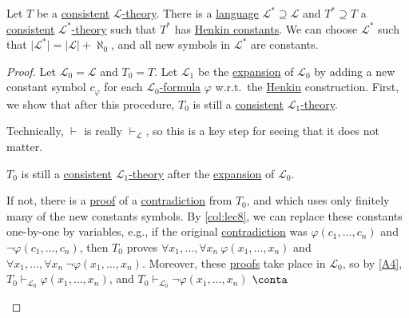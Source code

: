 \begin{theorem}\label{thm:lec8}
	Let \(T\) be a \hyperref[def:consistent]{consistent} \hyperref[def:theory]{\(\mathcal{L} \)-theory}. There is a \hyperref[def:language]{language} \(\mathcal{L} ^{\ast} \supseteq \mathcal{L}\) and \(T^{\ast} \supseteq T\) a \hyperref[def:consistent]{consistent} \hyperref[def:theory]{\(\mathcal{L} ^{\ast} \)-theory} such that \(T^{\ast} \) has \hyperref[def:Henkin-constant]{Henkin constants}. We can choose \(\mathcal{L} ^{\ast} \) such that \(\vert \mathcal{L} ^{\ast} \vert = \vert \mathcal{L} \vert + \aleph _0\), and all new symbols in \(\mathcal{L} ^{\ast} \) are constants.
\end{theorem}
\begin{proof}
	Let \(\mathcal{L} _0 = \mathcal{L} \) and \(T_0 = T\). Let \(\mathcal{L} _1\) be the \hyperref[not:expansion]{expansion} of \(\mathcal{L} _0\) by adding a new constant symbol \(c_{\varphi} \) for each \hyperref[def:formula]{\(\mathcal{L} _0\)-formula} \(\varphi\) w.r.t.\ the \hyperref[def:Henkin-constant]{Henkin} construction. First, we show that after this procedure, \(T_0\) is still a \hyperref[def:consistent]{consistent} \hyperref[def:theory]{\(\mathcal{L} _1\)-theory}.

	\begin{remark}
		Technically, \(\vdash \) is really \(\vdash _{\mathcal{L} }\), so this is a key step for seeing that it does not matter.
	\end{remark}

	\begin{claim}
		\(T_0\) is still a \hyperref[def:consistent]{consistent} \hyperref[def:theory]{\(\mathcal{L} _1\)-theory} after the \hyperref[not:expansion]{expansion} of \(\mathcal{L} _0\).
	\end{claim}
	\begin{explanation}
		If not, there is a \hyperref[def:proof]{proof} of a \hyperref[prop:proof-by-contradiction]{contradiction} from \(T_0\), and which uses only finitely many of the new constants symbols. By \autoref{col:lec8}, we can replace these constants one-by-one by variables, e.g., if the original \hyperref[prop:proof-by-contradiction]{contradiction} was \(\varphi (c_1, \ldots , c_n)\) and \(\lnot \varphi (c_1, \ldots , c_n)\), then \(T_0\) proves \(\forall x_1, \ldots , \forall x_n\ \varphi (x_1, \ldots , x_n)\) and \(\forall x_1, \ldots , \forall x_n\ \lnot \varphi (x_1, \ldots , x_n)\). Moreover, these \hyperref[def:proof]{proofs} take place in \(\mathcal{L} _0\), so by \autoref{A4}, \(T_0 \vdash _{\mathcal{L} _0} \varphi (x_1, \ldots , x_n)\), and \(T_0 \vdash _{\mathcal{L} _0} \lnot \varphi (x_1, \ldots , x_n)\) \(\conta\)
	\end{explanation}


\end{proof}
